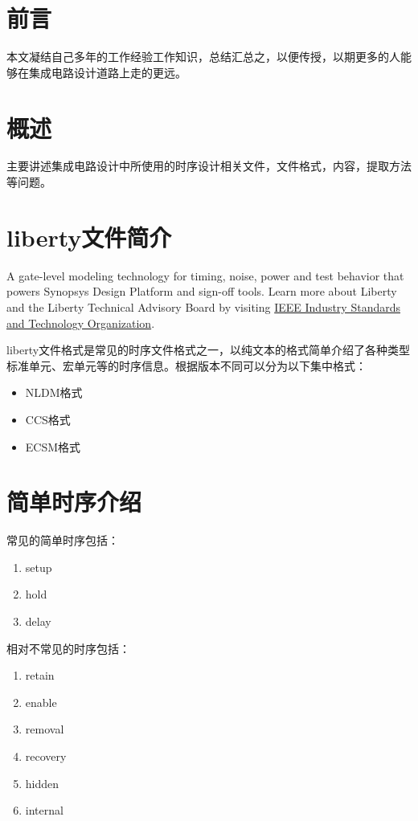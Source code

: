 \documentclass{training}
\begin{document}
\section{前言}
本文凝结自己多年的工作经验工作知识，总结汇总之，以便传授，以期更多的人能够在集成电路设计道路上走的更远。

\section{概述}
主要讲述集成电路设计中所使用的时序设计相关文件，文件格式，内容，提取方法等问题。

\section{liberty文件简介}
A gate-level modeling technology for timing, noise, power and test behavior that powers Synopsys Design Platform and sign-off tools. Learn more about Liberty and the Liberty Technical Advisory Board by visiting \href{http://ieee-isto.org/member_programs/liberty-technical-advisory-board/}{IEEE Industry Standards and Technology Organization}.

liberty文件格式是常见的时序文件格式之一，以纯文本的格式简单介绍了各种类型标准单元、宏单元等的时序信息。根据版本不同可以分为以下集中格式：
\begin{itemize}
\item NLDM格式
\item CCS格式
\item ECSM格式
\end{itemize}

\section{简单时序介绍}
常见的简单时序包括：
\begin{enumerate}
  \item setup
  \item hold
  \item delay
\end{enumerate}

相对不常见的时序包括：
\begin{enumerate}
  \item retain
  \item enable
  \item removal
  \item recovery
  \item hidden
  \item internal
\end{enumerate}
\end{document}

